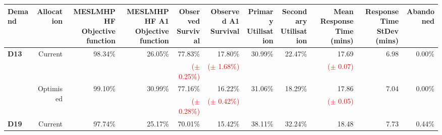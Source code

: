 \begin{tabular}{lrrrrrrrrrr}
\toprule
Demand & Allocation & \specialcellr{MESLMHPHF\\ Objective function} & \specialcellr{MESLMHPHF A1\\Objective function} & \specialcellr{Observed\\Survival} & \specialcellr{Observed A1\\Survival} & \specialcellr{Primary\\Utilisation} & \specialcellr{Secondary\\Utilisation} & \specialcellr{Mean Response\\Time (mins)} &  \specialcellr{Response Time\\StDev (mins)} & Abandoned \\
\midrule
\multirow{4}{*}{\textbf{D13}} & \multirow{2}{*}{Current}   & \multirow{2}{*}{98.34\%} & \multirow{2}{*}{26.05\%} & 77.83\%                         & 17.80\%                         & \multirow{2}{*}{30.99\%} & \multirow{2}{*}{22.47\%} & 17.69                         & \multirow{2}{*}{6.98}  & \multirow{2}{*}{0.00\%} \\
                              &                            &                          &                          & \textcolor{red}{($\pm$ 0.25\%)} & \textcolor{red}{($\pm$ 1.68\%)} &                          &                          & \textcolor{red}{($\pm$ 0.07)} &                        &                         \\[2mm]
                              & \multirow{2}{*}{Optimised} & \multirow{2}{*}{99.10\%} & \multirow{2}{*}{30.99\%} & 77.16\%                         & 16.22\%                         & \multirow{2}{*}{31.06\%} & \multirow{2}{*}{18.29\%} & 17.86                         & \multirow{2}{*}{7.04}  & \multirow{2}{*}{0.00\%} \\
                              &                            &                          &                          & \textcolor{red}{($\pm$ 0.28\%)} & \textcolor{red}{($\pm$ 0.42\%)} &                          &                          & \textcolor{red}{($\pm$ 0.05)} &                        &                         \\
\midrule
\multirow{4}{*}{\textbf{D19}} & \multirow{2}{*}{Current}   & \multirow{2}{*}{97.74\%} & \multirow{2}{*}{25.17\%} & 70.01\%                         & 15.42\%                         & \multirow{2}{*}{38.11\%} & \multirow{2}{*}{32.24\%} & 18.48                         & \multirow{2}{*}{7.73}  & \multirow{2}{*}{0.44\%} \\

\end{tabular}
